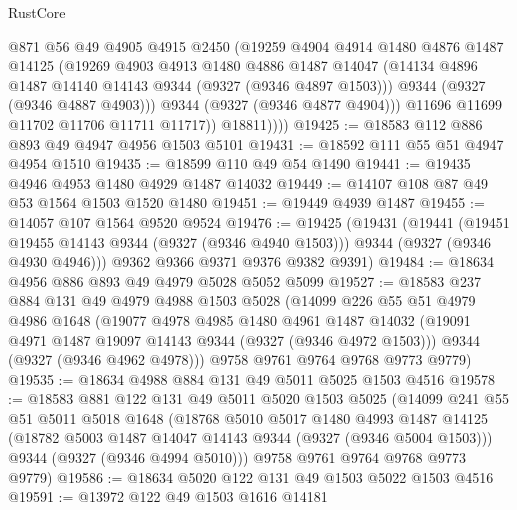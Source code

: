 \begin{lexlean}{RustCore}
\begin{coremodule}
                @871
                @56
                @49
                @4905
                @4915
                @2450
                (@19259
                  @4904
                  @4914
                  @1480
                  @4876
                  @1487
                  @14125
                  (@19269
                    @4903
                    @4913
                    @1480
                    @4886
                    @1487
                    @14047
                    (@14134 @4896 @1487 @14140 @14143 @9344 (@9327 (@9346 @4897 @1503)))
                    @9344
                    (@9327 (@9346 @4887 @4903)))
                  @9344
                  (@9327 (@9346 @4877 @4904)))
                @11696
                @11699
                @11702
                @11706
                @11711
                @11717))
            @18811))))
@19425 := @18583 @112 @886 @893 @49 @4947 @4956 @1503 @5101
@19431 := @18592 @111 @55 @51 @4947 @4954 @1510
@19435 := @18599 @110 @49 @54 @1490
@19441 := @19435 @4946 @4953 @1480 @4929 @1487 @14032
@19449 := @14107 @108 @87 @49 @53 @1564 @1503 @1520 @1480
@19451 := @19449 @4939 @1487
@19455 := @14057 @107 @1564 @9520 @9524
@19476 := @19425
    (@19431
      (@19441
        (@19451 @19455 @14143 @9344 (@9327 (@9346 @4940 @1503)))
        @9344
        (@9327 (@9346 @4930 @4946)))
      @9362
      @9366
      @9371
      @9376
      @9382
      @9391)
@19484 := @18634 @4956 @886 @893 @49 @4979 @5028 @5052 @5099
@19527 := @18583
    @237
    @884
    @131
    @49
    @4979
    @4988
    @1503
    @5028
    (@14099
      @226
      @55
      @51
      @4979
      @4986
      @1648
      (@19077
        @4978
        @4985
        @1480
        @4961
        @1487
        @14032
        (@19091 @4971 @1487 @19097 @14143 @9344 (@9327 (@9346 @4972 @1503)))
        @9344
        (@9327 (@9346 @4962 @4978)))
      @9758
      @9761
      @9764
      @9768
      @9773
      @9779)
@19535 := @18634 @4988 @884 @131 @49 @5011 @5025 @1503 @4516
@19578 := @18583
    @881
    @122
    @131
    @49
    @5011
    @5020
    @1503
    @5025
    (@14099
      @241
      @55
      @51
      @5011
      @5018
      @1648
      (@18768
        @5010
        @5017
        @1480
        @4993
        @1487
        @14125
        (@18782 @5003 @1487 @14047 @14143 @9344 (@9327 (@9346 @5004 @1503)))
        @9344
        (@9327 (@9346 @4994 @5010)))
      @9758
      @9761
      @9764
      @9768
      @9773
      @9779)
@19586 := @18634 @5020 @122 @131 @49 @1503 @5022 @1503 @4516
@19591 := @13972 @122 @49 @1503 @1616 @14181

\end{coremodule}
\end{lexlean}
